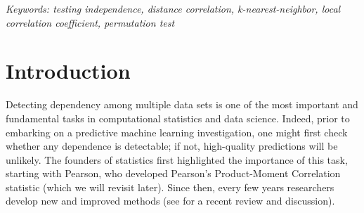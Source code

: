 \documentclass[11pt]{article}
\begin{document}
\noindent%
{\it Keywords: testing independence, distance correlation, k-nearest-neighbor, local correlation coefficient, permutation test}
\vfill

\clearpage
\tableofcontents


\newpage
{}







\section{Introduction}

Detecting dependency among multiple data sets is one of the most important and fundamental tasks in computational statistics and data science. 
Indeed, prior to embarking on a predictive machine learning investigation, one might first check whether any dependence is detectable; if not, high-quality predictions will be unlikely.  
The founders of statistics first highlighted the importance of this task, starting with Pearson, who developed Pearson's Product-Moment Correlation statistic  \cite{Pearson1895} (which we will revisit later).  Since then, every few years researchers develop new and improved methods (see \cite{Reimherr2013} for a recent review and discussion).  
\end{document}
